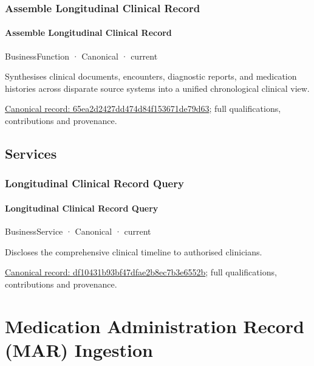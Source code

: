 \subsubsection{Assemble Longitudinal Clinical Record}

\paragraph{Assemble Longitudinal Clinical Record}

\label{element:65ea2d2427dd474d84f153671de79d63}
{\small BusinessFunction · Canonical · current}\par

Synthesises clinical documents, encounters, diagnostic reports, and medication histories across disparate source systems into a unified chronological clinical view.


{\footnotesize \href{../../../../continuum/business/business-function/65ea2d2427dd474d84f153671de79d63.md}{Canonical record: 65ea2d2427dd474d84f153671de79d63}; full qualifications, contributions and provenance.}\par
\subsection{Services}

\subsubsection{Longitudinal Clinical Record Query}

\paragraph{Longitudinal Clinical Record Query}

\label{element:df10431b93bf47dfae2b8ec7b3e6552b}
{\small BusinessService · Canonical · current}\par

Discloses the comprehensive clinical timeline to authorised clinicians.


{\footnotesize \href{../../../../continuum/business/business-service/df10431b93bf47dfae2b8ec7b3e6552b.md}{Canonical record: df10431b93bf47dfae2b8ec7b3e6552b}; full qualifications, contributions and provenance.}\par
\section{Medication Administration Record (MAR) Ingestion}

